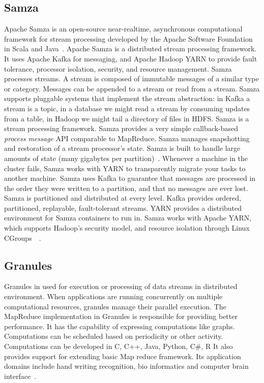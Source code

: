      \pv


     
\subsection{Samza}

Apache Samza is an open-source near-realtime, asynchronous
computational framework for stream processing developed by the Apache
Software Foundation in Scala and Java~\cite{www-samza-3}.  Apache
Samza is a distributed stream processing framework. It uses Apache
Kafka for messaging, and Apache Hadoop YARN to provide fault
tolerance, processor isolation, security, and resource
management. Samza processes streams. A stream is composed of immutable
messages of a similar type or category. Messages can be appended to a
stream or read from a stream.  Samza supports pluggable systems that
implement the stream abstraction: in Kafka a stream is a topic, in a
database we might read a stream by consuming updates from a table, in
Hadoop we might tail a directory of files in HDFS. Samza is a stream
processing framework. Samza provides a very simple callback-based
\textit{process message} API comparable to MapReduce.  Samza manages
snapshotting and restoration of a stream processor's state.  Samza is
built to handle large amounts of state (many gigabytes per
partition)~\cite{www-samza-1}.  Whenever a machine in the cluster
fails, Samza works with YARN to transparently migrate your tasks to
another machine. Samza uses Kafka to guarantee that messages are
processed in the order they were written to a partition, and that no
messages are ever lost.  Samza is partitioned and distributed at every
level. Kafka provides ordered, partitioned, replayable, fault-tolerant
streams. YARN provides a distributed environment for Samza containers
to run in. Samza works with Apache YARN, which supports Hadoop's
security model, and resource isolation through Linux
CGroups~\cite{www-samza-4}~\cite{www-samza-3}.

\subsection{Granules}

Granules in used for execution or processing of data streams in
distributed environment.  When applications are running concurrently
on multiple computational resources, granules manage their parallel
execution.  The MapReduce implementation in Granules is responsible
for providing better performance. It has the capability of expressing
computations like graphs.  Computations can be scheduled based on
periodicity or other activity.  Computations can be developed in C,
C++, Java, Python, C\#, R It also provides support for extending basic
Map reduce framework.  Its application domains include hand writing
recognition, bio informatics and computer brain
interface~\cite{www-granules}.

